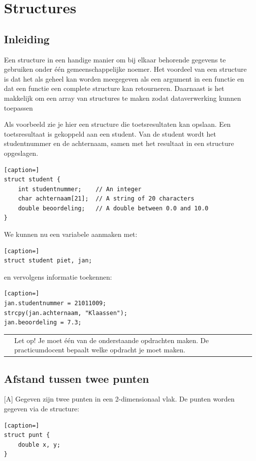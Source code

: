 \documentclass[a4paper,10pt,fleqn,twoside]{article}
\newcommand{\letop}{%
\vspace{4ex plus 1ex minus 1ex}
\begin{mdframed}[outerlinewidth = 1 ,%
roundcorner = 4 pt,%
leftmargin = 40,%
rightmargin = 40,%
backgroundcolor = yellow!40,%
outerlinecolor = red!70!black,%
innertopmargin = \topskip,%
splittopskip = \topskip,%
]
\begin{tabularx}{\linewidth}{m{1cm}X}
\Large\leftpointright & Let op! Je moet één van de onderstaande opdrachten maken. De practicumdocent bepaalt welke opdracht je moet maken.
\end{tabularx}
\end{mdframed}
\vspace{4ex plus 1ex minus 1ex}
}
\begin{document}
\clearpage
\section{Structures}


\subsection{Inleiding}
Een structure in een handige manier om bij elkaar behorende gegevens te gebruiken onder één gemeenschappelijke noemer. Het voordeel van een structure is dat het als geheel kan worden meegegeven als een argument in een functie en dat een functie een complete structure kan retourneren. Daarnaast is het makkelijk om een array van structures te maken zodat dataverwerking kunnen toepassen

Als voorbeeld zie je hier een structure die toetsresultaten kan opslaan. Een toetsresultaat is gekoppeld aan een student. Van de student wordt het studentnummer en de achternaam, samen met het resultaat in een structure opgeslagen.

\begin{lstlisting}[caption=]
struct student {
	int studentnummer;    // An integer
	char achternaam[21];  // A string of 20 characters
	double beoordeling;   // A double between 0.0 and 10.0
}
\end{lstlisting}

We kunnen nu een variabele aanmaken met:

\begin{lstlisting}[caption=]
struct student piet, jan;
\end{lstlisting}

en vervolgens informatie toekennen:

\begin{lstlisting}[caption=]
jan.studentnummer = 21011009;
strcpy(jan.achternaam, "Klaassen");
jan.beoordeling = 7.3;
\end{lstlisting}

\letop
\clearpage

\subsection{Afstand tussen twee punten}[A]
Gegeven zijn twee punten in een 2-dimensionaal vlak. De punten worden gegeven via de structure:

\begin{lstlisting}[caption=]
struct punt {
    double x, y;
}
\end{lstlisting}
\end{document}
